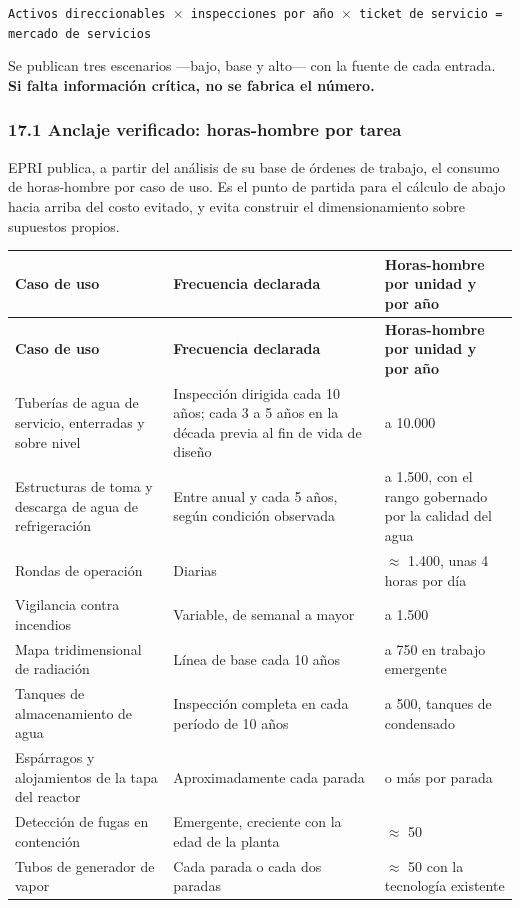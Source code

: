 \documentclass[11pt,a4paper]{article}
\begin{document}
\texttt{Activos direccionables $\times$ inspecciones por año $\times$ ticket de servicio = mercado de servicios}

Se publican tres escenarios —bajo, base y alto— con la fuente de cada entrada. \textbf{Si falta información crítica, no se fabrica el número.}


\subsubsection*{17.1 Anclaje verificado: horas-hombre por tarea}

EPRI publica, a partir del análisis de su base de órdenes de trabajo, el consumo de horas-hombre por caso de uso. Es el punto de partida para el cálculo de abajo hacia arriba del costo evitado, y evita construir el dimensionamiento sobre supuestos propios.

\begingroup\footnotesize
\setlength{\tabcolsep}{4pt}
\setlength{\emergencystretch}{4em}
 
\begin{longtable}{@{}>{\RaggedRight\arraybackslash}p{}>{\RaggedRight\arraybackslash}p{}>{\RaggedRight\arraybackslash}p{}@{}}
\toprule
\scriptsize\textbf{Caso de uso} & \scriptsize\textbf{Frecuencia declarada} & \scriptsize\textbf{Horas-hombre por unidad y por año} \\
\midrule
\endfirsthead
\toprule
\scriptsize\textbf{Caso de uso} & \scriptsize\textbf{Frecuencia declarada} & \scriptsize\textbf{Horas-hombre por unidad y por año} \\
\midrule
\endhead
\bottomrule
\endfoot
Tuberías de agua de servicio, enterradas y sobre nivel & Inspección dirigida cada 10 años; cada 3 a 5 años en la década previa al fin de vida de diseño & 5.000 a 10.000 \\
Estructuras de toma y descarga de agua de refrigeración & Entre anual y cada 5 años, según condición observada & 50 a 1.500, con el rango gobernado por la calidad del agua \\
Rondas de operación & Diarias & $\approx$ 1.400, unas 4 horas por día \\
Vigilancia contra incendios & Variable, de semanal a mayor & 500 a 1.500 \\
Mapa tridimensional de radiación & Línea de base cada 10 años & 250 a 750 en trabajo emergente \\
Tanques de almacenamiento de agua & Inspección completa en cada período de 10 años & 50 a 500, tanques de condensado \\
Espárragos y alojamientos de la tapa del reactor & Aproximadamente cada parada & 150 o más por parada \\
Detección de fugas en contención & Emergente, creciente con la edad de la planta & $\approx$ 50 \\
Tubos de generador de vapor & Cada parada o cada dos paradas & $\approx$ 50 con la tecnología existente \\
\end{longtable}
\endgroup
\end{document}
